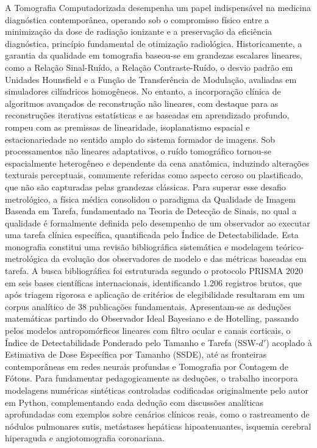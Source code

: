 \documentclass[
  12pt,
  a4paper,
  oneside
]{report}
\begin{document}
A Tomografia Computadorizada desempenha um papel indispensável na medicina diagnóstica contemporânea, operando sob o compromisso físico entre a minimização da dose de radiação ionizante e a preservação da eficiência diagnóstica, princípio fundamental de otimização radiológica. Historicamente, a garantia da qualidade em tomografia baseou-se em grandezas escalares lineares, como a Relação Sinal-Ruído, a Relação Contraste-Ruído, o desvio padrão em Unidades Hounsfield e a Função de Transferência de Modulação, avaliadas em simuladores cilíndricos homogêneos. No entanto, a incorporação clínica de algoritmos avançados de reconstrução não lineares, com destaque para as reconstruções iterativas estatísticas e as baseadas em aprendizado profundo, rompeu com as premissas de linearidade, isoplanatismo espacial e estacionariedade no sentido amplo do sistema formador de imagens. Sob processamentos não lineares adaptativos, o ruído tomográfico tornou-se espacialmente heterogêneo e dependente da cena anatômica, induzindo alterações texturais perceptuais, comumente referidas como aspecto ceroso ou plastificado, que não são capturadas pelas grandezas clássicas. Para superar esse desafio metrológico, a física médica consolidou o paradigma da Qualidade de Imagem Baseada em Tarefa, fundamentado na Teoria de Detecção de Sinais, no qual a qualidade é formalmente definida pelo desempenho de um observador ao executar uma tarefa clínica específica, quantificada pelo Índice de Detectabilidade. Esta monografia constitui uma revisão bibliográfica sistemática e modelagem teórico-metrológica da evolução dos observadores de modelo e das métricas baseadas em tarefa. A busca bibliográfica foi estruturada segundo o protocolo PRISMA 2020 em seis bases científicas internacionais, identificando 1.206 registros brutos, que após triagem rigorosa e aplicação de critérios de elegibilidade resultaram em um corpus analítico de 38 publicações fundamentais. Apresentam-se as deduções matemáticas partindo do Observador Ideal Bayesiano e de Hotelling, passando pelos modelos antropomórficos lineares com filtro ocular e canais corticais, o Índice de Detectabilidade Ponderado pelo Tamanho e Tarefa (SSW-$d'$) acoplado à Estimativa de Dose Específica por Tamanho (SSDE), até as fronteiras contemporâneas em redes neurais profundas e Tomografia por Contagem de Fótons. Para fundamentar pedagogicamente as deduções, o trabalho incorpora modelagens numéricas sintéticas controladas codificadas originalmente pelo autor em Python, complementando cada dedução com discussões analíticas aprofundadas com exemplos sobre cenários clínicos reais, como o rastreamento de nódulos pulmonares sutis, metástases hepáticas hipoatenuantes, isquemia cerebral hiperaguda e angiotomografia coronariana.
\end{document}
